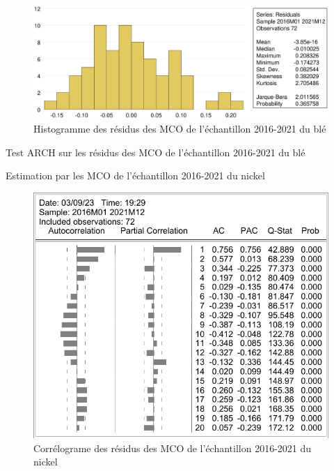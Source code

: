 \documentclass[12pt,a4paper]{article}
\begin{document}
\begin{figure}[H]
    \centering
    \includegraphics[width=\textwidth]{annexe/3_2_mco_hist_ble.eps}
    \caption{Histogramme des résidus des MCO de l'échantillon 2016-2021 du blé}
    \label{fig:mco_hist_ble21}
\end{figure}

\begin{table}[H]
    \centering
    \caption{Test ARCH sur les résidus des MCO de l'échantillon 2016-2021 du blé}
    \sffamily
    
    \label{tab:mco_homo_ble19}
\end{table}

\begin{table}[H]
    \centering
    \caption{Estimation par les MCO de l'échantillon 2016-2021 du nickel}
    \sffamily
    \label{tab:mco_nickel21}
    
\end{table}

\begin{figure}[H]
    \centering
    \label{fig:mco_cor_nickel21}
    \includegraphics[]{annexe/3_2_mco_corr_nickel.pdf}
    \caption{Corrélograme des résidus des MCO de l'échantillon 2016-2021 du nickel}
\end{figure}
\end{document}
